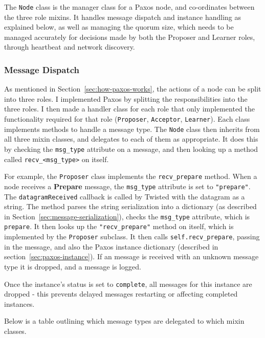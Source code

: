\documentclass[12pt,twoside,notitlepage]{report}
\newcommand{\msg}[1] {{\bf #1}}         %
\begin{document}
The \verb+Node+ class is the manager class for a Paxos node, and co-ordinates between the three
role mixins. It handles message dispatch and instance handling as explained below, as well as
managing the quorum size, which needs to be managed accurately for decisions made by both the
Proposer and Learner roles, through heartbeat and network discovery.

\subsubsection{Message Dispatch}

As mentioned in Section~\ref{sec:how-paxos-works}, the actions of a node can be split into three
roles. I implemented Paxos by splitting the responsibilities into the three roles. I then made a
handler class for each role that only implemented the functionality required for that role
(\verb+Proposer+, \verb+Acceptor+, \verb+Learner+). Each class implements methods to handle a
message type. The \verb+Node+ class then inherits from all three mixin classes, and delegates to
each of them as appropriate. It does this by checking the \verb+msg_type+ attribute on a message,
and then looking up a method called \verb+recv_<msg_type>+ on itself.

For example, the \verb+Proposer+ class implements the \verb+recv_prepare+ method. When a node
receives a \msg{Prepare} message, the \verb+msg_type+ attribute is set to \verb+"prepare"+. The
\verb+datagramReceived+ callback is called by Twisted with the datagram as a string. The method
parses the string serialization into a dictionary (as described in
Section~\ref{sec:message-serialization}), checks the \verb+msg_type+ attribute, which is
\verb+prepare+. It then looks up the \verb+"recv_prepare"+ method on itself, which is implemented
by the \verb+Proposer+ subclass. It then calls \verb+self.recv_prepare+, passing in the message,
and also the Paxos instance dictionary (described in section~\ref{sec:paxos-instance}). If an
message is received with an unknown message type it is dropped, and a message is logged.

Once the instance's status is set to \verb+complete+, all messages for this instance are dropped -
this prevents delayed messages restarting or affecting completed instances.

Below is a table outlining which message types are delegated to which mixin classes. \\
\end{document}
